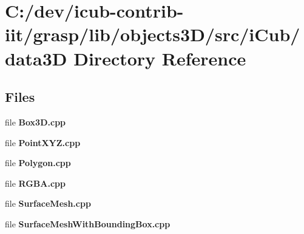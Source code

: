 \section{C\+:/dev/icub-\/contrib-\/iit/grasp/lib/objects3\+D/src/i\+Cub/data3\+D Directory Reference}
\label{dir_ced8d42f22d85e7d12f8e45af6539178}
\subsection*{Files}
\begin{DoxyCompactItemize}
\item 
file {\bfseries Box3\+D.\+cpp}
\item 
file {\bfseries Point\+X\+Y\+Z.\+cpp}
\item 
file {\bfseries Polygon.\+cpp}
\item 
file {\bfseries R\+G\+B\+A.\+cpp}
\item 
file {\bfseries Surface\+Mesh.\+cpp}
\item 
file {\bfseries Surface\+Mesh\+With\+Bounding\+Box.\+cpp}
\end{DoxyCompactItemize}
